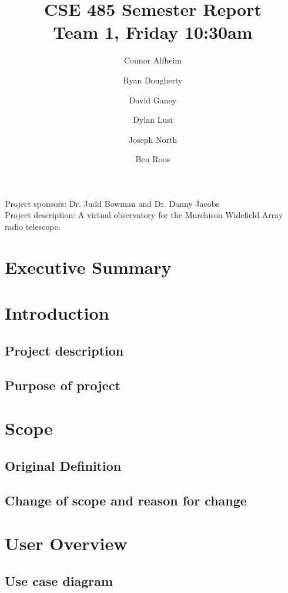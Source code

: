 \documentclass[12pt]{article}
\begin{document}
\begin{spacing}{.4}
\setlength{\droptitle}{-7em}
\title{CSE 485 Semester Report \\  Team 1, Friday 10:30am}
\author{Connor Alfheim \and Ryan Dougherty \and David Ganey \and Dylan Lusi \and Joseph North \and Ben Roos}
\maketitle
\end{spacing}

\begin{spacing}{1.5}
\noindent
Project sponsors: Dr. Judd Bowman and Dr. Danny Jacobs \\
Project description: A virtual observatory for the Murchison Widefield Array radio telescope.
\newpage

\tableofcontents

\section{Executive Summary}

\section{Introduction}
\subsection{Project description}
\subsection{Purpose of project}

\section{Scope}
\subsection{Original Definition}
\subsection{Change of scope and reason for change}

\section{User Overview}
\subsection{Use case diagram}

\end{spacing}
\end{document}
